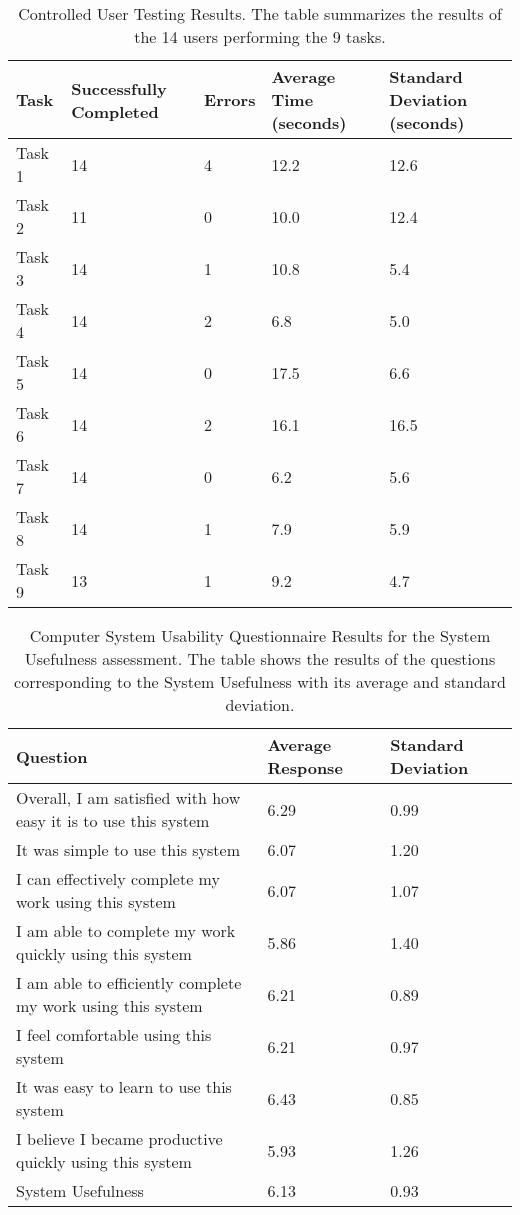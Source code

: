 \documentclass[twocolumn]{bmcart}%
\begin{document}
\begin{backmatter}
\begin{table}[h!]
\caption{Controlled User Testing Results. The table summarizes the results of the 14 users performing the 9 tasks.}
      \begin{tabular}{lC{1.5cm}C{0.75cm}R{1.2cm}R{1.2cm}}
      \hline
      Task & Successfully Completed & Errors & Average Time (seconds) & Standard Deviation (seconds)\\ \hline
      Task 1 & 14 & 4 & 12.2 & 12.6 \\
      Task 2 & 11 & 0 & 10.0 & 12.4 \\
      Task 3 & 14 & 1 & 10.8 &  5.4 \\
      Task 4 & 14 & 2 &  6.8 &  5.0 \\
      Task 5 & 14 & 0 & 17.5 & 6.6 \\ 
      Task 6 & 14 & 2 & 16.1 & 16.5 \\ 
      Task 7 & 14 & 0 &  6.2 & 5.6 \\ 
      Task 8 & 14 & 1 &  7.9 & 5.9 \\ 
      Task 9 & 13 & 1 &  9.2 & 4.7 \\ \hline
      \end{tabular}
\label{tbl:tasksResults}
\end{table}

\begin{table}[h!]
\caption{Computer System Usability Questionnaire Results for the System Usefulness assessment. The table shows the results of the questions corresponding to the System Usefulness with its average and standard deviation.}
      \begin{tabular}{L{3.85cm}R{1.2cm}R{1.2cm}}
      \hline
      Question & Average Response & Standard Deviation \\ \hline
      Overall, I am satisfied with how easy it is to use this system & 6.29 & 0.99 \\
      It was simple to use this system & 6.07 & 1.20 \\
      I can effectively complete my work using this system & 6.07 & 1.07 \\
      I am able to complete my work quickly using this system & 5.86 & 1.40 \\
      I am able to efficiently complete my work using this system & 6.21 & 0.89 \\
      I feel comfortable using this system & 6.21 & 0.97 \\
      It was easy to learn to use this system & 6.43 & 0.85 \\
      I believe I became productive quickly using this system & 5.93 & 1.26 \\ \hline
      System Usefulness & 6.13 & 0.93 \\ \hline
      \end{tabular}
\label{tbl:CSUQSystemUsefulnessResults}
\end{table}


\end{backmatter}
\end{document}
